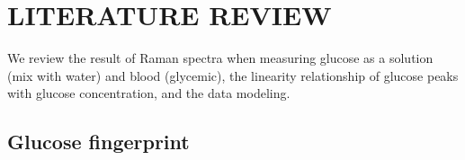 \setlength{\footskip}{8mm}

\chapter{LITERATURE REVIEW}\label{literatureReview}

We review the result of Raman spectra when measuring glucose as a solution (mix with water) and blood (glycemic), the linearity relationship of glucose peaks with glucose concentration, and the data modeling.







\section{Glucose fingerprint}

